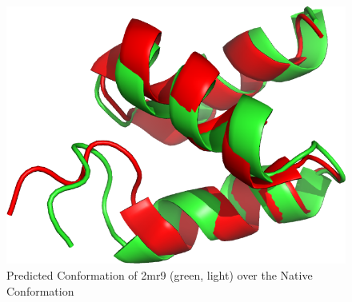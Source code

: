 \begin{figure}[ht]
    \centering
    \includegraphics[width=0.9\linewidth]{Figuras/prots/2mr9_render.png}
    \caption{Predicted Conformation of 2mr9 (green, light) over the Native Conformation}
    \label{fig:2mr9-visual}
\end{figure}


